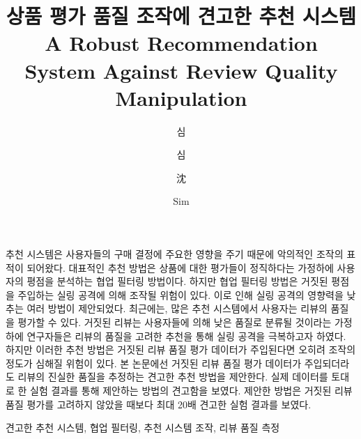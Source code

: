 \documentclass[master,english,final]{kaist-ucs}
\title[korean] {상품 평가 품질 조작에 견고한 추천 시스템}
\title[english]{A Robust Recommendation System \linebreak Against Review Quality Manipulation}
\author[korean] {심}{동 진}
\author[korean2] {심}{동진}    %
\author[chinese]{沈}{東 鎭}
\author[english]{Sim}{Dongjin}
\begin{document}

   \thesisinfo
    \begin{summary}
    추천 시스템은 사용자들의 구매 결정에 주요한 영향을 주기 때문에 악의적인 조작의 표적이 되어왔다.
    대표적인 추천 방법은 상품에 대한 평가들이 정직하다는 가정하에 사용자의 평점을 분석하는 협업 필터링 방법이다.
    하지만 협업 필터링 방법은 거짓된 평점을 주입하는 실링 공격에 의해 조작될 위험이 있다.
    이로 인해 실링 공격의 영향력을 낮추는 여러 방법이 제안되었다.
    최근에는, 많은 추천 시스템에서 사용자는 리뷰의 품질을 평가할 수 있다.
    거짓된 리뷰는 사용자들에 의해 낮은 품질로 분류될 것이라는 가정하에 연구자들은 리뷰의 품질을 고려한 추천을 통해 실링 공격을 극복하고자 하였다.
    하지만 이러한 추천 방법은 거짓된 리뷰 품질 평가 데이터가 주입된다면 오히려 조작의 정도가 심해질 위험이 있다.
    본 논문에선 거짓된 리뷰 품질 평가 데이터가 주입되더라도 리뷰의 진실한 품질을 추정하는 견고한 추천 방법을 제안한다.
    실제 데이터를 토대로 한 실험 결과를 통해 제안하는 방법의 견고함을 보였다.
    제안한 방법은 거짓된 리뷰 품질 평가를 고려하지 않았을 때보다 최대 20배 견고한 실험 결과를 보였다.
    \end{summary}

    \begin{Korkeyword}
    견고한 추천 시스템, 협업 필터링, 추천 시스템 조작, 리뷰 품질 측정
    \end{Korkeyword}
\end{document}
